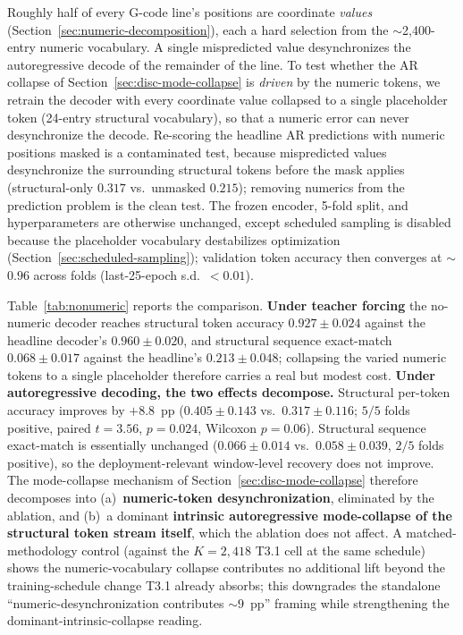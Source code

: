 \documentclass[sensors,article,submit,moreauthors,pdftex]{Definitions/mdpi}
\begin{document}
Roughly half of every G-code line's positions are coordinate \emph{values} (Section~\ref{sec:numeric-decomposition}), each a hard selection from the $\sim$2{,}400-entry numeric vocabulary. A single mispredicted value desynchronizes the autoregressive decode of the remainder of the line. To test whether the AR collapse of Section~\ref{sec:disc-mode-collapse} is \emph{driven} by the numeric tokens, we retrain the decoder with every coordinate value collapsed to a single placeholder token (24-entry structural vocabulary), so that a numeric error can never desynchronize the decode. Re-scoring the headline AR predictions with numeric positions masked is a contaminated test, because mispredicted values desynchronize the surrounding structural tokens before the mask applies (structural-only $0.317$ vs.\ unmasked $0.215$); removing numerics from the prediction problem is the clean test. The frozen encoder, 5-fold split, and hyperparameters are otherwise unchanged, except scheduled sampling is disabled because the placeholder vocabulary destabilizes optimization (Section~\ref{sec:scheduled-sampling}); validation token accuracy then converges at $\sim$$0.96$ across folds (last-25-epoch s.d.\ $<\!0.01$).

Table~\ref{tab:nonumeric} reports the comparison. \textbf{Under teacher forcing} the no-numeric decoder reaches structural token accuracy $0.927 \pm 0.024$ against the headline decoder's $0.960 \pm 0.020$, and structural sequence exact-match $0.068 \pm 0.017$ against the headline's $0.213 \pm 0.048$; collapsing the varied numeric tokens to a single placeholder therefore carries a real but modest cost. \textbf{Under autoregressive decoding, the two effects decompose.} Structural per-token accuracy improves by $+8.8$~pp ($0.405 \pm 0.143$ vs.\ $0.317 \pm 0.116$; $5/5$ folds positive, paired $t=3.56$, $p=0.024$, Wilcoxon $p=0.06$). Structural sequence exact-match is essentially unchanged ($0.066 \pm 0.014$ vs.\ $0.058 \pm 0.039$, $2/5$ folds positive), so the deployment-relevant window-level recovery does not improve. The mode-collapse mechanism of Section~\ref{sec:disc-mode-collapse} therefore decomposes into (a)~\textbf{numeric-token desynchronization}, eliminated by the ablation, and (b)~a dominant \textbf{intrinsic autoregressive mode-collapse of the structural token stream itself}, which the ablation does not affect. A matched-methodology control (against the $K\!=\!2{,}418$ T3.1 cell at the same schedule) shows the numeric-vocabulary collapse contributes no additional lift beyond the training-schedule change T3.1 already absorbs; this downgrades the standalone ``numeric-desynchronization contributes $\sim\!9$~pp'' framing while strengthening the dominant-intrinsic-collapse reading.
\end{document}
